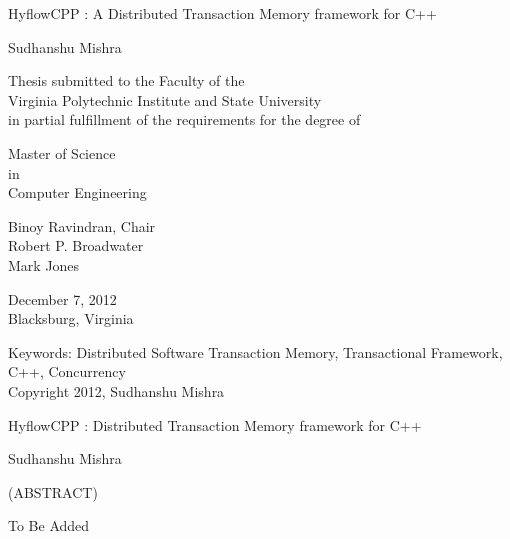 \documentclass[12pt,english]{report}
\begin{document}
\thispagestyle{empty}
\begin{center}

{\Large 
HyflowCPP : A Distributed Transaction Memory framework for C++
}

\vfill

Sudhanshu Mishra

\vfill

Thesis submitted to the Faculty of the \\
Virginia Polytechnic Institute and State University \\
in partial fulfillment of the requirements for the degree of

\vfill

Master of Science \\
in \\
Computer Engineering


\vfill

Binoy Ravindran, Chair \\
Robert P. Broadwater \\
Mark Jones


\vfill

December 7, 2012 \\
Blacksburg, Virginia

\vfill

Keywords: Distributed Software Transaction Memory, Transactional Framework, C++, Concurrency
\\
Copyright 2012, Sudhanshu Mishra

\end{center}

\pagebreak

\thispagestyle{empty}
\begin{center}

{\large
HyflowCPP : Distributed Transaction Memory framework for C++
}

\vfill

Sudhanshu Mishra

\vfill

(ABSTRACT)

\vfill

\end{center}

To Be Added




\vfill


\end{document}

